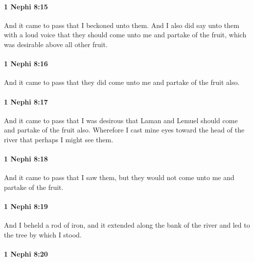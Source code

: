 		\paragraph{1 Nephi 8:15} %
			\label{1NEPHI-8-15}

			And it came to pass that I beckoned unto them.
			And I also did say unto them with a loud voice
			that they should come unto me and partake of the fruit,
			which was desirable above all other fruit.

		\paragraph{1 Nephi 8:16} %
			\label{1NEPHI-8-16}

			And it came to pass that they did come unto me and partake of the fruit also.

		\paragraph{1 Nephi 8:17} %
			\label{1NEPHI-8-17}

			And it came to pass that I was desirous
			that Laman and Lemuel should come and partake of the fruit also.
			Wherefore I cast mine eyes toward the head of the river
			that perhaps I might see them.

		\paragraph{1 Nephi 8:18} %
			\label{1NEPHI-8-18}

			And it came to pass that I saw them,
			but they would not come unto me and partake of the fruit.

		\paragraph{1 Nephi 8:19} %
			\label{1NEPHI-8-19}

			And I beheld a rod of iron,
			and it extended along the bank of the river
			and led to the tree by which I stood.

		\paragraph{1 Nephi 8:20} %
			\label{1NEPHI-8-20}

